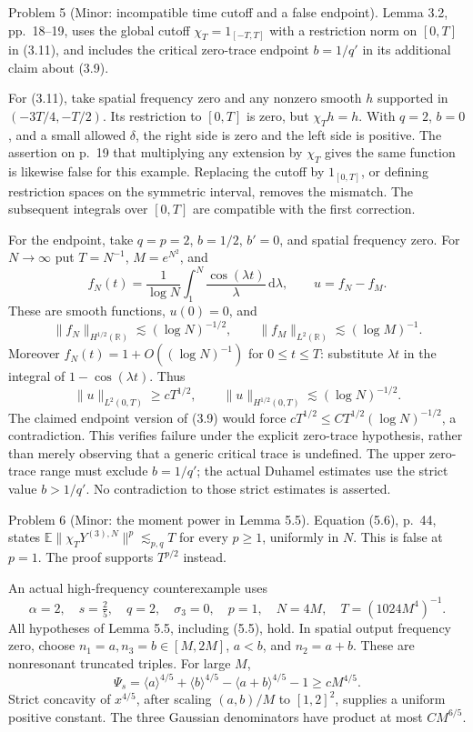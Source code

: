 \documentclass[10pt]{article}
\begin{document}
Problem 5 (Minor: incompatible time cutoff and a false endpoint).  Lemma 3.2, pp. 18–19, uses the global cutoff \(\chi_T=1_{[-T,T]}\) with a restriction norm on \([0,T]\) in (3.11), and includes the critical zero-trace endpoint \(b=1/q'\) in its additional claim about (3.9).\par
For (3.11), take spatial frequency zero and any nonzero smooth \(h\) supported in \((-3T/4,-T/2)\). Its restriction to \([0,T]\) is zero, but \(\chi_Th=h\). With \(q=2\), \(b=0\), and a small allowed \(\delta\), the right side is zero and the left side is positive. The assertion on p. 19 that multiplying any extension by \(\chi_T\) gives the same function is likewise false for this example. Replacing the cutoff by \(1_{[0,T]}\), or defining restriction spaces on the symmetric interval, removes the mismatch. The subsequent integrals over \([0,T]\) are compatible with the first correction.\par
For the endpoint, take \(q=p=2\), \(b=1/2\), \(b'=0\), and spatial frequency zero. For \(N\to\infty\) put \(T=N^{-1}\), \(M=e^{N^2}\), and \[f_N(t)=\frac1{\log N}\int_1^N\frac{\cos(\lambda t)}{\lambda}
          \,\mathrm d\lambda,\qquad u=f_N-f_M.\] These are smooth functions, \(u(0)=0\), and \[\|f_N\|_{H^{1/2}(\mathbb R)}\lesssim(\log N)^{-1/2},
 \qquad
 \|f_M\|_{L^2(\mathbb R)}\lesssim(\log M)^{-1}.\] Moreover \(f_N(t)=1+O((\log N)^{-1})\) for \(0\le t\le T\): substitute \(\lambda t\) in the integral of \(1-\cos(\lambda t)\). Thus \[\|u\|_{L^2(0,T)}\ge cT^{1/2},\qquad
 \|u\|_{H^{1/2}(0,T)}\lesssim(\log N)^{-1/2}.\] The claimed endpoint version of (3.9) would force \(cT^{1/2}\le CT^{1/2}(\log N)^{-1/2}\), a contradiction. This verifies failure under the explicit zero-trace hypothesis, rather than merely observing that a generic critical trace is undefined. The upper zero-trace range must exclude \(b=1/q'\); the actual Duhamel estimates use the strict value \(b>1/q'\). No contradiction to those strict estimates is asserted.\par
Problem 6 (Minor: the moment power in Lemma 5.5).  Equation (5.6), p. 44, states \(\mathbb E\|\chi_TY^{(3),N}\|^p\lesssim_{p,q}T\) for every \(p\ge1\), uniformly in \(N\). This is false at \(p=1\). The proof supports \(T^{p/2}\) instead.\par
An actual high-frequency counterexample uses \[\alpha=2,\quad s=\tfrac25,\quad q=2,\quad
 \sigma_3=0,\quad p=1,\quad
 N=4M,\quad T=(1024M^4)^{-1}.\] All hypotheses of Lemma 5.5, including (5.5), hold. In spatial output frequency zero, choose \(n_1=a,n_3=b\in[M,2M]\), \(a<b\), and \(n_2=a+b\). These are nonresonant truncated triples. For large \(M\), \[\Psi_s=\langle a\rangle^{4/5}+\langle b\rangle^{4/5}
       -\langle a+b\rangle^{4/5}-1\ge cM^{4/5}.\] Strict concavity of \(x^{4/5}\), after scaling \((a,b)/M\) to \([1,2]^2\), supplies a uniform positive constant. The three Gaussian denominators have product at most \(CM^{6/5}\).\par
\end{document}
